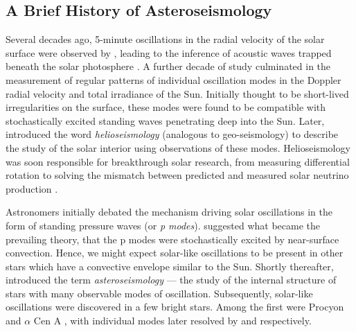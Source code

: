 \subsection{A Brief History of Asteroseismology}

Several decades ago, 5-minute oscillations in the radial velocity of the solar surface were observed by \citet{Leighton.Noyes.ea1962}, leading to the inference of acoustic waves trapped beneath the solar photosphere \citep{Ulrich1970}. A further decade of study culminated in the measurement of regular patterns of individual oscillation modes in the Doppler radial velocity \citep{Claverie.Isaak.ea1979} and total irradiance \citep{Woodard.Hudson1983a} of the Sun. Initially thought to be short-lived irregularities on the surface, these modes were found to be compatible with stochastically excited standing waves penetrating deep into the Sun. Later, \citet{Deubner.Gough1984} introduced the word \emph{helioseismology} (analogous to geo-seismology) to describe the study of the solar interior using observations of these modes. Helioseismology was soon responsible for breakthrough solar research, from measuring differential rotation \citep{Deubner.Ulrich.ea1979} to solving the mismatch between predicted and measured solar neutrino production \citep{Bahcall.Ulrich1988}.

Astronomers initially debated the mechanism driving solar oscillations in the form of standing pressure waves (or \emph{p modes}). \citet{Goldreich.Keeley1977} suggested what became the prevailing theory, that the p modes were stochastically excited by near-surface convection. Hence, we might expect solar-like oscillations to be present in other stars which have a convective envelope similar to the Sun. Shortly thereafter, \citet{Christensen-Dalsgaard1984} introduced the term \emph{asteroseismology} --- the study of the internal structure of stars with many observable modes of oscillation. Subsequently, solar-like oscillations were discovered in a few bright stars. Among the first were Procyon and \(\alpha\) Cen A \citep{Gelly.Grec.ea1986}, with individual modes later resolved by \citet{Martic.Schmitt.ea1999} and \citet{Bouchy.Carrier2001} respectively.

